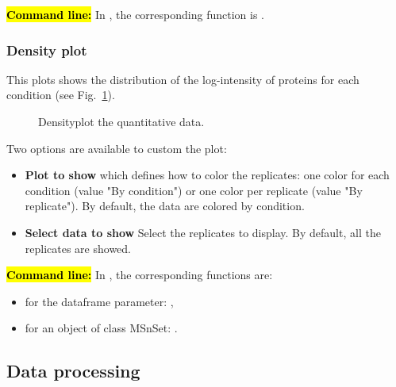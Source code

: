 \documentclass[12pt]{article}
\begin{document}
\hl{\bf Command line:} In , the corresponding function is 
.

\subsubsection{Density plot}\label{sec:densityplot}
This plots shows the distribution of the log-intensity of proteins for each 
condition (see Fig.~\ref{fig:sddp}).

\begin {figure}
\centering
{}
\caption{Densityplot the quantitative data.}\label{fig:sddp}
\end {figure}

{Two options are available to custom the plot:
\begin{itemize}
\item \textbf{Plot to show} which defines how to color the replicates: one 
color for each condition (value "By condition") or one color per replicate 
(value "By replicate"). By default, the data are colored by condition.
\item \textbf{Select data to show} Select the replicates to display. By 
default, all the replicates are showed.
\end {itemize}
}


\hl{\bf Command line:} In , the corresponding functions are:
\begin{itemize}
\item for the dataframe parameter: ,
\item for an object of class MSnSet: .
\end{itemize}


\subsection{Data processing}\label{sec:processingadataset}
\end{document}
